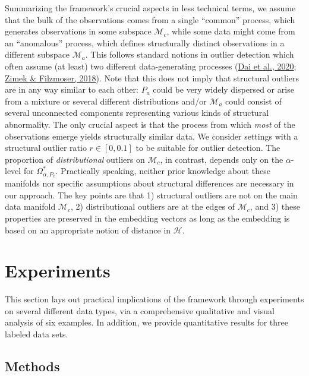 \documentclass[
  10pt]{article}
\newcommand{\hdspace}{\mathcal{H}}
\newcommand{\co}{c}
\newcommand{\an}{a}
\newcommand{\Min}{\mathcal{M}_{\co}}
\newcommand{\Man}{\mathcal{M}_{\an}}
\newcommand{\Pin}{P_{\co}}
\newcommand{\Pan}{P_{\an}}
\begin{document}
Summarizing the framework's crucial aspects in less technical terms, we assume that the bulk of the observations comes from a single ``common'' process, which generates observations in some subspace \(\Min\), while some data might come from an ``anomalous'' process, which defines structurally distinct observations in a different subspace \(\Man\). This follows standard notions in outlier detection which often assume (at least) two different data-generating processes (\protect\hyperlink{ref-dai2020functional}{Dai et al., 2020}; \protect\hyperlink{ref-zimek2018there}{Zimek \& Filzmoser, 2018}). Note that this does not imply that structural outliers are in any way similar to each other: \(\Pan\) could be very widely dispersed or arise from a mixture or several different distributions and/or \(\Man\) could consist of several unconnected components representing various kinds of structural abnormality. The only crucial aspect is that the process from which \emph{most} of the observations emerge yields structurally similar data.
We consider settings with a structural outlier ratio \(r \in [0, 0.1]\) to be suitable for outlier detection. The proportion of \emph{distributional} outliers on \(\Min\), in contrast, depends only on the \(\alpha\)-level for \(\Omega^*_{\alpha, \Pin}\).
Practically speaking, neither prior knowledge about these manifolds nor specific assumptions about structural differences are necessary in our approach.
The key points are that 1) structural outliers are not on the main data manifold \(\Min\), 2) distributional outliers are at the edges of \(\Min\), and 3) these properties are preserved in the embedding vectors as long as the embedding is based on an appropriate notion of distance in \(\hdspace\).\\

\section{Experiments}\label{sec:exps}

This section lays out practical implications of the framework through experiments on several different data types, via a comprehensive qualitative and visual analysis of six examples. In addition, we provide quantitative results for three labeled data sets.

\subsection{Methods}\label{sec:exps:meths}
\end{document}

